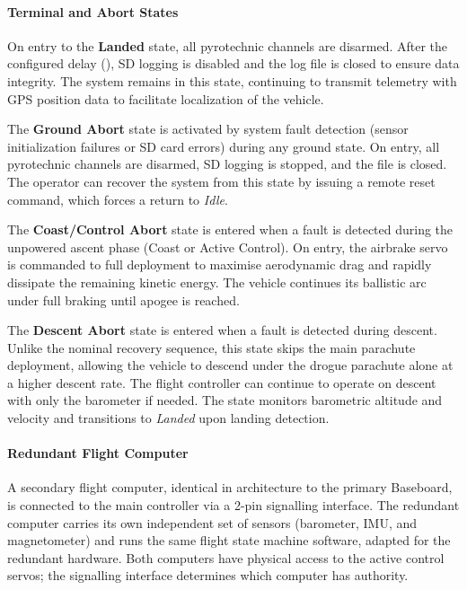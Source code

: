 \paragraph{Terminal and Abort States}

On entry to the \textbf{Landed} state, all pyrotechnic channels are disarmed. After the configured delay (), SD logging is disabled and the log file is closed to ensure data integrity. The system remains in this state, continuing to transmit telemetry with GPS position data to facilitate localization of the vehicle.

The \textbf{Ground Abort} state is activated by system fault detection (sensor initialization failures or SD card errors) during any ground state. On entry, all pyrotechnic channels are disarmed, SD logging is stopped, and the file is closed. The operator can recover the system from this state by issuing a remote reset command, which forces a return to \emph{Idle}.

The \textbf{Coast/Control Abort} state is entered when a fault is detected during the unpowered ascent phase (Coast or Active Control). On entry, the airbrake servo is commanded to full deployment to maximise aerodynamic drag and rapidly dissipate the remaining kinetic energy. The vehicle continues its ballistic arc under full braking until apogee is reached. 

The \textbf{Descent Abort} state is entered when a fault is detected during descent. Unlike the nominal recovery sequence, this state skips the main parachute deployment, allowing the vehicle to descend under the drogue parachute alone at a higher descent rate. The flight controller can continue to operate on descent with only the barometer if needed. The state monitors barometric altitude and velocity and transitions to \emph{Landed} upon landing detection.

\paragraph{Redundant Flight Computer}

A secondary flight computer, identical in architecture to the primary Baseboard, is connected to the main controller via a 2-pin signalling interface. The redundant computer carries its own independent set of sensors (barometer, IMU, and magnetometer) and runs the same flight state machine software, adapted for the redundant hardware. Both computers have physical access to the active control servos; the signalling interface determines which computer has authority.

